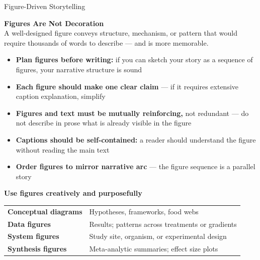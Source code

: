 \documentclass{beamer}
\begin{document}
\begin{frame}{Figure-Driven Storytelling}

  \footnotesize
  \textbf{Figures Are Not Decoration}\\
  \smallskip
  A well-designed figure conveys structure, mechanism, or pattern
  that would require thousands of words to describe --- and is
  more memorable.

  \medskip
  \begin{itemize}
    \item \textbf{Plan figures before writing:} if you can sketch
      your story as a sequence of figures, your narrative structure
      is sound
    \item \textbf{Each figure should make one clear claim} ---
      if it requires extensive caption explanation, simplify
    \item \textbf{Figures and text must be mutually reinforcing,}
      not redundant --- do not describe in prose what is already
      visible in the figure
    \item \textbf{Captions should be self-contained:} a reader
      should understand the figure without reading the main text
    \item \textbf{Order figures to mirror narrative arc} ---
      the figure sequence is a parallel story
  \end{itemize}

  \medskip
  \textbf{Use figures creatively and purposefully}\\
  \smallskip
  {\scriptsize
  \begin{tabular}{@{}ll@{}}
    \hline
    \textbf{Conceptual diagrams}  & Hypotheses, frameworks, food webs \\
    \textbf{Data figures}         & Results; patterns across treatments or gradients \\
    \textbf{System figures}       & Study site, organism, or experimental design \\
    \textbf{Synthesis figures}    & Meta-analytic summaries; effect size plots \\
    \hline
  \end{tabular}
  }

\end{frame}
\end{document}
